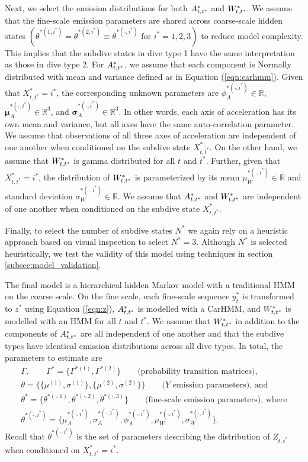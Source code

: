 Next, we select the emission distributions for both $A^*_{t,t^*}$ and $W^*_{t,t^*}$. We assume that the fine-scale emission parameters are shared across coarse-scale hidden states $\left(\theta^{*(1,i^*)} = \theta^{*(2,i^*)} \equiv \theta^{*(\cdot,i^*)} \text{ for } i^* = 1,2,3\right)$ to reduce model complexity. This implies that the subdive states in dive type 1 have the same interpretation as those in dive type 2. 
%
For $A^*_{t,t^*}$, we assume that each component is Normally distributed with mean and variance defined as in Equation (\ref{eqn:carhmm}). Given that $X^*_{t,t^*} = i^*$, the corresponding unknown parameters are $\phi_A^{*(\cdot,i^*)} \in \mathbb{R}$, $\mathbf{\mu}_A^{*(\cdot,i^*)} \in \mathbb{R}^3$, and $\mathbf{\sigma}_A^{*(\cdot,i^*)} \in \mathbb{R}^3$. In other words, each axis of acceleration has its own mean and variance, but all axes have the same auto-correlation parameter. We assume that observations of all three axes of acceleration are independent of one another when conditioned on the subdive state $X^*_{t,t^*}$.
%
On the other hand, we assume that $W^*_{t,t^*}$ is gamma distributed for all $t$ and $t^*$. Further, given that $X^*_{t,t^*} = i^*$, the distribution of $W^*_{t,t^*}$ is parameterized by its mean $\mu_W^{*(\cdot,i^*)} \in \mathbb{R}$ and standard deviation $\sigma_W^{*(\cdot,i^*)} \in \mathbb{R}$. We assume that $A^*_{t,t^*}$ and $W^*_{t,t^*}$ are independent of one another when conditioned on the subdive state $X^*_{t,t^*}$.

Finally, to select the number of subdive states $N^*$ we again rely on a heuristic approach based on visual inspection to select $N^* = 3$. Although $N^*$ is selected heuristically, we test the validity of this model using techniques in section \ref{subsec:model_validation}.

The final model is a hierarchical hidden Markov model with a traditional HMM on the coarse scale. On the fine scale, each fine-scale sequence $y^*_t$ is transformed to $z^*$ using Equation (\ref{eqn:z}), $A^*_{t,t^*}$ is modelled with a CarHMM, and $W^*_{t,t^*}$ is modelled with an HMM for all $t$ and $t^*$. We assume that $W^*_{t,t^*}$ in addition to the components of $A^*_{t,t^*}$ are all independent of one another and that the subdive types have identical emission distributions across all dive types. In total, the parameters to estimate are
%
\begin{gather*}
    \Gamma, \qquad \Gamma^{*} = \{\Gamma^{*(1)},\Gamma^{*(2)}\} \qquad \text{(probability transition matrices)}, \\
    \theta = \{\{\mu^{(1)},\sigma^{(1)}\},\{\mu^{(2)},\sigma^{(2)}\}\} \qquad \text{($Y$ emission parameters), and} \\
    \theta^* = \{\theta^{*(\cdot,1)},\theta^{*(\cdot,2)},\theta^{*(\cdot,3)}\}  \qquad \text{(fine-scale emission parameters), where} \\
    \theta^{*(\cdot,i^*)} =  \{\mu_A^{*(\cdot,i^*)},\sigma_A^{*(\cdot,i^*)},\phi_A^{*(\cdot,i^*)},\mu_W^{*(\cdot,i^*)},\sigma_W^{*(\cdot,i^*)}\}.
\end{gather*}
%
Recall that $\theta^{*(\cdot,i^*)}$ is the set of parameters describing the distribution of $Z_{t,t^*}$ when conditioned on $X^*_{t,t^*} = i^*$. 

